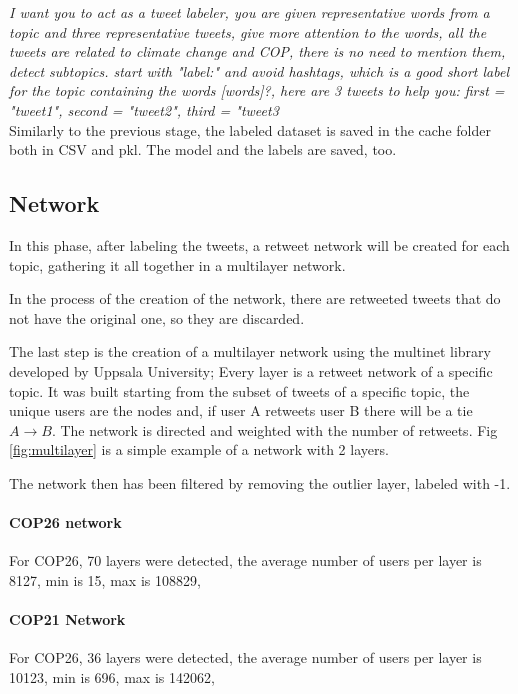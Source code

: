 \textit{    I want you to act as a tweet labeler, you are given representative words
from a topic and three representative tweets, give more attention to the words, all the tweets are related to climate change and COP, there is no need to mention them, detect subtopics.
start with "label:" and avoid hashtags,
which is a good short label for the topic containing the words [{words}]?, here are 3 tweets to help you:
first = "{tweet1}", second = "{tweet2}", third = "{tweet3}}
\\

Similarly to the previous stage, the labeled dataset is saved in the cache folder both in CSV and pkl. The model and the labels are saved, too.



\subsection{Network}
In this phase, after labeling the tweets, a retweet network will be created for each topic, gathering it all together in a multilayer network.

In the process of the creation of the network, there are retweeted tweets that do not have the original one, so they are  discarded.

The last step is the creation of a multilayer network using the multinet library developed by Uppsala University; Every layer is a retweet network of a specific topic. It was built starting from the subset of tweets of a specific topic, the unique users are the nodes and, if user A retweets user B there will be a tie $A \rightarrow B$. The network is directed and weighted with the number of retweets. Fig \ref{fig:multilayer} is a simple example of a network with 2 layers.

The network then has been filtered by removing the outlier layer, labeled with -1.

\paragraph{COP26 network}
For COP26, 70 layers were detected, the average number of users per layer is 8127, min is 15, max is 108829,

\paragraph{COP21 Network}
For COP26, 36 layers were detected, the average number of users per layer is 10123, min is 696, max is 142062,



